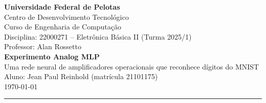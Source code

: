 \documentclass[11pt,a4paper]{article}
\begin{document}
\begin{center}
  {\large \textbf{Universidade Federal de Pelotas}}\\
  Centro de Desenvolvimento Tecnológico\\
  Curso de Engenharia de Computação\\
  Disciplina: 22000271 -- Eletrônica Básica II (Turma 2025/1)\\
  Professor: Alan Rossetto\\[3ex]
  {\LARGE\bfseries Experimento Analog MLP}\\[0.6ex]
  {\large Uma rede neural de amplificadores operacionais que
  reconhece dígitos do MNIST}\\[2ex]
  Aluno: Jean Paul Reinhold (matrícula 21101175)\\
  \today
\end{center}

\vspace{1ex}
\hrule
\vspace{2ex}







\end{document}
